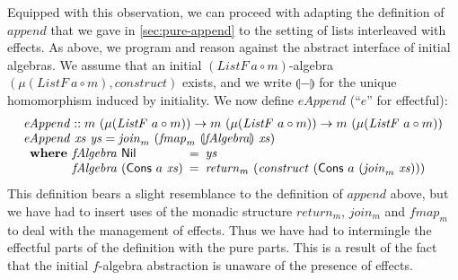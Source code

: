 \documentclass{jfp1}
\newcommand{\fold}[1]{\llparenthesis #1 \rrparenthesis}
\begin{document}
Equipped with this observation, we can proceed with adapting the
definition of $\mathit{append}$ that we gave in
\autoref{sec:pure-append} to the setting of lists interleaved with
effects. As above, we program and reason against the abstract
interface of initial algebras. We assume that an initial
$(\mathit{ListF}~a \circ m)$-algebra $(\mu(\mathit{ListF}~a \circ m),
\mathit{construct})$ exists, and we write $\fold{-}$ for the unique
homomorphism induced by initiality. We now define $\mathit{eAppend}$
(``$\mathit{e}$'' for effectful):
\begin{displaymath}
  \begin{array}{l}
    \mathit{eAppend} :: m~(\mu (\mathit{ListF}~a \circ m)) \to m~(\mu (\mathit{ListF}~a \circ m)) \to m~(\mu (\mathit{ListF}~a \circ m)) \\
    \mathit{eAppend}~\mathit{xs}~\mathit{ys} = \mathit{join}_m~(\mathit{fmap}_m~\fold{\mathit{fAlgebra}}~\mathit{xs}) \\
    \begin{array}{r@{\hspace{0.4em}}l@{\hspace{0.5em}}c@{\hspace{0.5em}}l}
      \textbf{where} & \mathit{fAlgebra}~\mathsf{Nil} &=& \mathit{ys} \\
                     & \mathit{fAlgebra}~(\mathsf{Cons}~a~\mathit{xs}) &=& \mathit{return}_m~(\mathit{construct}~(\mathsf{Cons}~a~(\mathit{join}_m~\mathit{xs})))
    \end{array}
  \end{array}
\end{displaymath}
This definition bears a slight resemblance to the definition of
$\mathit{append}$ above, but we have had to insert uses of the monadic
structure $\mathit{return_m}$, $\mathit{join_m}$ and $\mathit{fmap_m}$
to deal with the management of effects. Thus we have had to
intermingle the effectful parts of the definition with the pure
parts. This is a result of the fact that the initial $f$-algebra
abstraction is unaware of the presence of effects.
\end{document}
